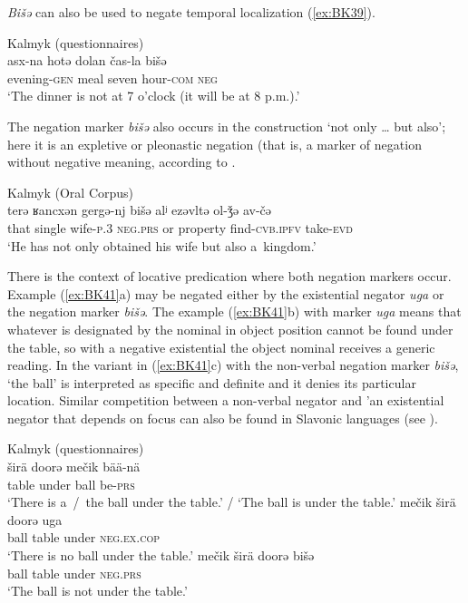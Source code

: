 \documentclass[output=paper]{langsci/langscibook}
\begin{document}
\textit{Bišǝ} can also be used to negate temporal localization (\ref{ex:BK39}).

\ea Kalmyk (questionnaires) \label{ex:BK39}\\
	\gll asx-na			hotə	dolan		čas-la		bišǝ\\
	evening-\textsc{gen}	meal	seven		hour-\textsc{com}	\textsc{neg}\\
	\glt `The dinner is not at 7 o’clock (it will be at 8 p.m.).'
\z


The negation marker \textit{bišǝ} also occurs in the construction ‘not only … but also’; here it is an expletive or pleonastic negation (that is, a marker of negation without negative meaning, according to \citet[126]{Horn2010}.

\ea Kalmyk (Oral Corpus) \label{ex:BK40}\\
	\gll terǝ	ʁancxǝn		gergǝ-nj		bišǝ			alʲ		ezǝvltǝ	ol-ǯǝ				av-čǝ\\
	that	single		wife-\textsc{p.3}		\textsc{neg.prs}		or		property	find-\textsc{cvb.ipfv}	take-\textsc{evd}\\
	\glt `He has not only obtained his wife but also a kingdom.'
\z


There is the context of locative predication where both negation markers occur. Example (\ref{ex:BK41}a) may be negated either by the existential negator \textit{uga} or the negation marker \textit{bišǝ}. The example (\ref{ex:BK41}b) with marker \textit{uga} means that whatever is designated by the nominal in object position cannot be found under the table, so with a negative existential the object nominal receives a generic reading. In the variant in (\ref{ex:BK41}c) with the non-verbal negation marker \textit{bišǝ}, ‘the ball’ is interpreted as specific and definite and it denies its particular location. Similar competition between a non-verbal negator and 'an existential negator that depends on focus can also be found in Slavonic languages (see \citealp[197]{Veselinova2010}).

\ea Kalmyk (questionnaires) \citep[14]{baranova2015a} \label{ex:BK41}\\
  \ea
	\gll širä	doorǝ		mečik		bää-nä\\
	table	under		ball		be-\textsc{prs}\\
	\glt `There is a / the ball under the table.’ / ‘The ball is under the table.'
  \ex
	\gll mečik		širä		doorǝ		uga\\
	ball		table		under		\textsc{neg.ex.cop}\\
	\glt `There is no ball under the table.'
  \ex
	\gll mečik		širä	doorǝ		bišǝ\\
	ball		table	under		\textsc{neg.prs}\\
	\glt `The ball is not under the table.'
\z \z
\end{document}
